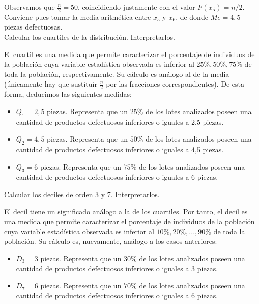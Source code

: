 Observamos que $\frac{n}{2} = 50$, coincidiendo justamente con el valor $F(x_{5}) = n/2$. Conviene pues tomar la media aritmética entre $x_{5}$ y $x_{6}$, de donde $Me = 4,5$ piezas defectuosas. \\

\subproblem
Calcular los cuartiles de la distribuci{\'o}n. Interpretarlos.

El cuartil es una medida que permite caracterizar el porcentaje de individuos de la población cuya variable estadística observada es inferior al $25\%, 50\%, 75\%$ de toda la población, respectivamente. Su cálculo es análogo al de la media (únicamente hay que sustituir $\frac{n}{2}$ por las fracciones correspondientes). De esta forma, deducimos las siguientes medidas:

\begin{itemize}
	\item $Q_{1} = 2,5$ piezas. Representa que un $25\%$ de los lotes analizados poseen una cantidad de productos defectuosos inferiores o iguales a 2,5 piezas.
	
	\item $Q_{2} = 4,5$ piezas. Representa que un $50\%$ de los lotes analizados poseen una cantidad de productos defectuosos inferiores o iguales a 4,5 piezas.
	
	\item $Q_{3} = 6$ piezas. Representa que un $75\%$ de los lotes analizados poseen una cantidad de productos defectuosos inferiores o iguales a 6 piezas.
\end{itemize}

\subproblem
Calcular los deciles de orden 3 y 7. Interpretarlos.

El decil tiene un significado análogo a la de los cuartiles. Por tanto, el decil es una medida que permite caracterizar el porcentaje de individuos de la población cuya variable estadística observada es inferior al $10\%, 20\%,..., 90\%$ de toda la población. Su cálculo es, nuevamente, análogo a los casos anteriores: 

\begin{itemize}
	\item $D_{3} = 3$ piezas. Representa que un $30\%$ de los lotes analizados poseen una cantidad de productos defectuosos inferiores o iguales a 3 piezas.
	
	\item $D_{7} = 6$ piezas. Representa que un $70\%$ de los lotes analizados poseen una cantidad de productos defectuosos inferiores o iguales a 6 piezas. \\
\end{itemize}


